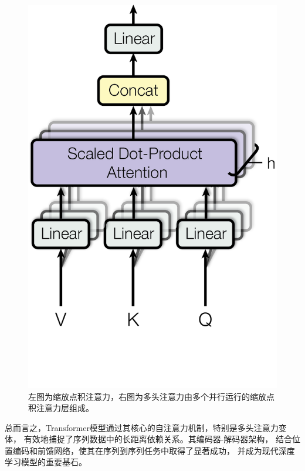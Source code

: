\begin{figure}[htbp]
\begin{minipage}[t]{0.4\textwidth}
  \end{minipage}
  \begin{minipage}[t]{0.4\textwidth}
    \centering
    \vspace{0.1cm}
    \includegraphics[scale=0.6]{figures/multihead.png}
  \end{minipage}
  \caption{左图为缩放点积注意力，右图为多头注意力由多个并行运行的缩放点积注意力层组成。\cite{vaswani2017attention}}
    \label{fig:multi-head-att}
\end{figure}

总而言之，Transformer模型通过其核心的自注意力机制，特别是多头注意力变体，
有效地捕捉了序列数据中的长距离依赖关系。其编码器-解码器架构，
结合位置编码和前馈网络，使其在序列到序列任务中取得了显著成功，
并成为现代深度学习模型的重要基石。


